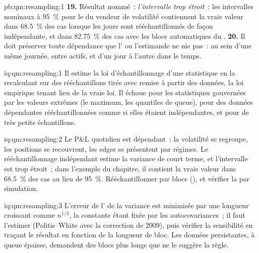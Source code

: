 \begin{solution}{pb:qm:resampling:1}
\textbf{19.} Résultat nommé~: \emph{l'intervalle trop étroit}~: les intervalles  nominaux à 95~\% pour le  du vendeur
de volatilité contiennent la vraie valeur dans 68.5~\% des cas lorsque les jours sont rééchantillonnés de façon indépendante, et dans 82.75~\% des cas
avec les blocs automatiques du .
\textbf{20.} Il doit préserver toute dépendance que l' ou l'estimande ne nie pas~: au sein d'une même journée, entre actifs, et
d'un jour à l'autre dans le temps.
\end{solution}

\begin{solution}{iq:qm:resampling:1}
Il estime la loi d'échantillonnage d'une statistique en la recalculant sur des rééchantillons tirés avec remise à partir des données, la loi empirique tenant
lieu de la vraie loi. Il échoue pour les statistiques gouvernées par les valeurs extrêmes (le maximum, les quantiles de queue), pour des données dépendantes rééchantillonnées comme si elles étaient
indépendantes, et pour de très petits échantillons.
\end{solution}

\begin{solution}{iq:qm:resampling:2}
Le P\&L quotidien est dépendant~: la volatilité se regroupe, les positions se recouvrent, les edges se présentent par régimes. Le rééchantillonnage indépendant estime la variance de court terme,
et l'intervalle est trop étroit~; dans l'exemple du chapitre, il contient la vraie valeur dans 68.5~\% des cas au lieu de 95~\%. Rééchantillonner par blocs (), et vérifier
la  par simulation.
\end{solution}

\begin{solution}{iq:qm:resampling:3}
L'erreur de l' de la variance est minimisée par une longueur croissant comme $n^{1/3}$, la constante étant fixée par les autocovariances~; il faut l'estimer
(Politis--White avec la correction de 2009), puis vérifier la sensibilité en traçant le résultat en fonction de la longueur de bloc. Les données persistantes,
à queue épaisse, demandent des blocs plus longs que ne le suggère la règle.
\end{solution}

